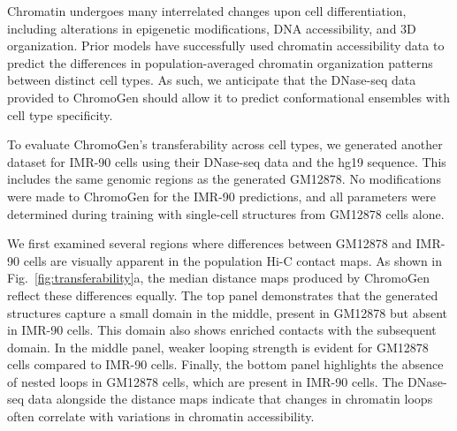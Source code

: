\documentclass[12pt,letterpaper]{article}
\begin{document}
Chromatin undergoes many interrelated changes upon cell differentiation, including alterations in epigenetic modifications, DNA accessibility, and 3D organization. %
Prior models have successfully used chromatin accessibility data to predict the differences in population-averaged chromatin organization patterns~\cite{Tan2023,Zhang2023a} between distinct cell types. As such, we anticipate that the DNase-seq data provided to ChromoGen should allow it to predict conformational ensembles with cell type specificity. 


To evaluate ChromoGen's transferability across cell types, we generated another dataset for IMR-90 cells using their DNase-seq data and the hg19 sequence. This includes the same genomic regions as the generated GM12878. No modifications were made to ChromoGen for the IMR-90 predictions, and all parameters were determined during training with single-cell structures from GM12878 cells alone.


We first examined several regions where differences between GM12878 and IMR-90 cells are visually apparent in the population Hi-C contact maps. As shown in Fig.~\ref{fig:transferability}a, the median distance maps produced by ChromoGen reflect these differences equally. The top panel demonstrates that the generated structures capture a small domain in the middle, present in GM12878 but absent in IMR-90 cells. This domain also shows enriched contacts with the subsequent domain. In the middle panel, weaker looping strength is evident for GM12878 cells compared to IMR-90 cells. Finally, the bottom panel highlights the absence of nested loops in GM12878 cells, which are present in IMR-90 cells. The DNase-seq data alongside the distance maps indicate that changes in chromatin loops often correlate with variations in chromatin accessibility.
\end{document}

